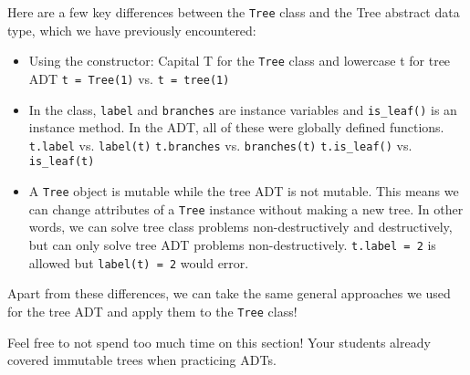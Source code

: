 \vspace{2mm}
Here are a few key differences between the \lstinline{Tree} class and the Tree abstract data type, which we have previously encountered: 
\begin{itemize}
\item Using the constructor: Capital T for the \lstinline{Tree} class and lowercase t for tree ADT
    \lstinline{t = Tree(1)} vs. \lstinline{t = tree(1)}
\item In the class, \lstinline{label} and \lstinline{branches} are instance variables and \lstinline{is_leaf()} is an instance method. In the ADT, all of these were globally defined functions.
    \subitem \lstinline{t.label} vs. \lstinline{label(t)}
    \subitem \lstinline{t.branches} vs. \lstinline{branches(t)}
    \subitem \lstinline{t.is_leaf()} vs. \lstinline{is_leaf(t)}
\item A \lstinline{Tree} object is mutable while the tree ADT is not mutable. This means we can change attributes of a \lstinline{Tree} instance without making a new tree. In other words, we can solve tree class problems non-destructively and destructively, but can only solve tree ADT problems non-destructively.
    \subitem \lstinline{t.label = 2} is allowed but \lstinline{label(t) = 2} would error.
\end{itemize}
Apart from these differences, we can take the same general approaches we used for the tree ADT and apply them to the \lstinline{Tree} class!

\begin{meta}
Feel free to not spend too much time on this section! Your students already covered immutable trees when practicing ADTs.  
\end{meta}